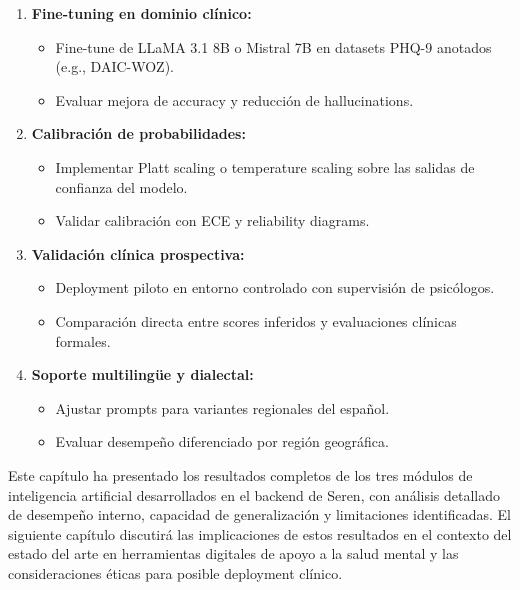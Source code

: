 \begin{enumerate}
    \item \textbf{Fine-tuning en dominio clínico:}
    \begin{itemize}
        \item Fine-tune de LLaMA 3.1 8B o Mistral 7B en datasets PHQ-9 anotados
              (e.g., DAIC-WOZ).
        \item Evaluar mejora de accuracy y reducción de hallucinations.
    \end{itemize}

    \item \textbf{Calibración de probabilidades:}
    \begin{itemize}
        \item Implementar Platt scaling o temperature scaling sobre las salidas de
              confianza del modelo.
        \item Validar calibración con ECE y reliability diagrams.
    \end{itemize}

    \item \textbf{Validación clínica prospectiva:}
    \begin{itemize}
        \item Deployment piloto en entorno controlado con supervisión de psicólogos.
        \item Comparación directa entre scores inferidos y evaluaciones clínicas formales.
    \end{itemize}

    \item \textbf{Soporte multilingüe y dialectal:}
    \begin{itemize}
        \item Ajustar prompts para variantes regionales del español.
        \item Evaluar desempeño diferenciado por región geográfica.
    \end{itemize}
\end{enumerate}

Este capítulo ha presentado los resultados completos de los tres módulos de inteligencia
artificial desarrollados en el backend de Seren, con análisis detallado de desempeño
interno, capacidad de generalización y limitaciones identificadas. El siguiente capítulo
discutirá las implicaciones de estos resultados en el contexto del estado del arte en
herramientas digitales de apoyo a la salud mental y las consideraciones éticas para
posible deployment clínico.
